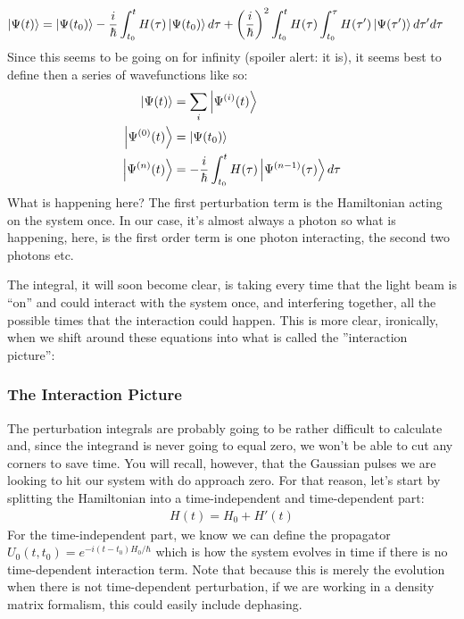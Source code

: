 \begin{align*}
	\Ket{\Psi(t)} & = \Ket{\Psi(t_0)} - \frac{i}{\hbar} \int_{t_0}^{t} H(\tau)  \Ket{\Psi(t_0)} d\tau + \left( \frac{i}{\hbar}\right)^2 \int_{t_0}^{t} H(\tau) \int_{t_0}^{\tau}  H(\tau')  \Ket{\Psi(\tau')} d\tau' d\tau
\end{align*}
Since this seems to be going on for infinity (spoiler alert: it is), it seems best to define then a series of wavefunctions like so:
\begin{align}
	\Ket{\Psi(t)} &= \sum_{i} \Ket{\Psi^{(i)} (t)} \\
	\Ket{\Psi^{(0)} (t)} &= \Ket{\Psi(t_0)} \\
	\Ket{\Psi^{(n)} (t)} &= - \frac{i}{\hbar} \int_{t_0}^{t} H(\tau)  \Ket{\Psi^{(n-1)} (\tau)} d\tau
\end{align}
What is happening here?  The first perturbation term is the Hamiltonian acting on the system once.  In our case, it's almost always a photon so what is happening, here, is the first order term is one photon interacting, the second two photons etc.

The integral, it will soon become clear, is taking every time that the light beam is ``on'' and could interact with the system once, and interfering together, all the possible times that the interaction could happen.  This is more clear, ironically, when we shift around these equations into what is called the  ''interaction picture'':

\subsubsection{The Interaction Picture}

The perturbation integrals are probably going to be rather difficult to calculate and, since the integrand is never going to equal zero, we won't be able to cut any corners to save time.  You will recall, however, that the Gaussian pulses we are looking to hit our system with do approach zero.  For that reason, let's start by splitting the Hamiltonian into a time-independent and time-dependent part:
\begin{align}
	H(t) = H_0 + H'(t)
\end{align}
For the time-independent part, we know we can define the propagator $U_0(t, t_0) = e^{-i (t - t_0) H_0 / \hbar}$ which is how the system evolves in time if there is no time-dependent interaction term.  Note that because this is merely the evolution when there is not time-dependent perturbation, if we are working in a density matrix formalism, this could easily include dephasing.

